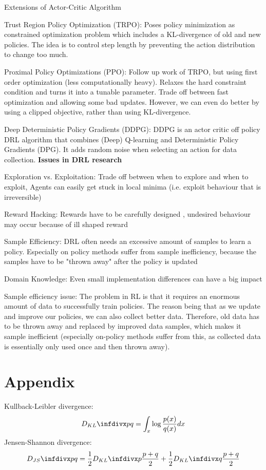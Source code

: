 \documentclass[12pt]{article}
\begin{document}
Extensions of Actor-Critic Algorithm
\ulb
\item Trust Region Policy Optimization (TRPO): Poses policy minimization as constrained optimization problem which includes a KL-divergence of old and new policies. The idea is to control step length by preventing the action distribution to change too much.
\item Proximal Policy Optimizations (PPO): Follow up work of TRPO, but using first order optimization (less computationally heavy). Relaxes the hard constraint condition and turns it into a tunable parameter. Trade off between fast optimization and allowing some bad updates. However, we can even do better by using a clipped objective, rather than using KL-divergence.
\item Deep Deterministic Policy Gradients (DDPG): DDPG is an actor critic off policy DRL algorithm that combines (Deep) Q-learning and Deterministic Policy Gradients (DPG). It adds random noise when selecting an action for data collection.
\ule
\textbf{Issues in DRL research}
\ulb
\item Exploration vs. Exploitation: Trade off between when to explore and when to exploit, Agents can easily get stuck in local minima (i.e. exploit behaviour that is irreversible)
\item Reward Hacking: Rewards have to be carefully designed , undesired behaviour may occur because of ill shaped reward
\item Sample Efficiency: DRL often needs an excessive amount of samples to learn a policy. Especially on policy methods suffer from sample inefficiency, because the samples have to be "thrown away" after the policy is updated
\item Domain Knowledge: Even small implementation differences can have a big impact
\ule
\par Sample efficiency issue: The problem in RL is that it requires an enormous amount of data to successfully train policies. The reason being that as we update and improve our policies, we can also collect better data. Therefore, old data has to be thrown away and replaced by improved data samples, which makes it sample inefficient (especially on-policy methods suffer from this, as collected data is essentially only used once and then thrown away).

\section{Appendix}
Kullback-Leibler divergence:
\[ \dkl{p}{q} = \int_{x} \log \frac{p(x)}{q(x)}dx \]
Jensen-Shannon divergence:
\[ \djs{p}{q} = \frac{1}{2}\dkl{p}{\frac{p+q}{2}}+\frac{1}{2}\dkl{q}{\frac{p+q}{2}} \]
\end{document}
